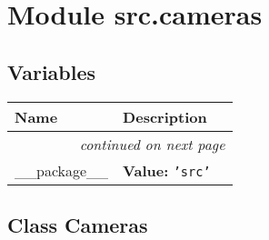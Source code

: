 %
%
%


\section{Module src.cameras}

    \label{src:cameras}


  \subsection{Variables}

    \vspace{-1cm}
\hspace{\varindent}\begin{longtable}{|p{\varnamewidth}|p{\vardescrwidth}|l}
\cline{1-2}
\cline{1-2} \centering \textbf{Name} & \centering \textbf{Description}& \\
\cline{1-2}
\endhead\cline{1-2}\multicolumn{3}{r}{\small\textit{continued on next page}}\\\endfoot\cline{1-2}
\endlastfoot\raggedright \_\-\_\-p\-a\-c\-k\-a\-g\-e\-\_\-\_\- & \raggedright \textbf{Value:} 
{\tt \texttt{'}\texttt{src}\texttt{'}}&\\
\cline{1-2}
\end{longtable}



\subsection{Class Cameras}

